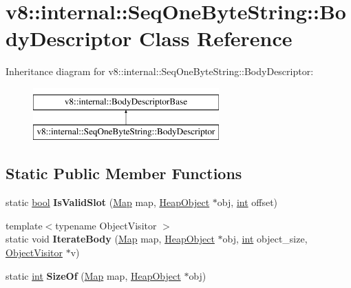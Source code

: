 \hypertarget{classv8_1_1internal_1_1SeqOneByteString_1_1BodyDescriptor}{}\section{v8\+:\+:internal\+:\+:Seq\+One\+Byte\+String\+:\+:Body\+Descriptor Class Reference}
\label{classv8_1_1internal_1_1SeqOneByteString_1_1BodyDescriptor}
Inheritance diagram for v8\+:\+:internal\+:\+:Seq\+One\+Byte\+String\+:\+:Body\+Descriptor\+:\begin{figure}[H]
\begin{center}
\leavevmode
\includegraphics[height=2.000000cm]{classv8_1_1internal_1_1SeqOneByteString_1_1BodyDescriptor}
\end{center}
\end{figure}
\subsection*{Static Public Member Functions}
\begin{DoxyCompactItemize}
\item 
\mbox{\label{classv8_1_1internal_1_1SeqOneByteString_1_1BodyDescriptor_ae0e93493ae5b3b86b698c8b9ca11453b}} 
static \mbox{\hyperlink{classbool}{bool}} {\bfseries Is\+Valid\+Slot} (\mbox{\hyperlink{classv8_1_1internal_1_1Map}{Map}} map, \mbox{\hyperlink{classv8_1_1internal_1_1HeapObject}{Heap\+Object}} $\ast$obj, \mbox{\hyperlink{classint}{int}} offset)
\item 
\mbox{\label{classv8_1_1internal_1_1SeqOneByteString_1_1BodyDescriptor_a7fba2a9f00b09b9f0dbbd28e2994e523}} 
{\footnotesize template$<$typename Object\+Visitor $>$ }\\static void {\bfseries Iterate\+Body} (\mbox{\hyperlink{classv8_1_1internal_1_1Map}{Map}} map, \mbox{\hyperlink{classv8_1_1internal_1_1HeapObject}{Heap\+Object}} $\ast$obj, \mbox{\hyperlink{classint}{int}} object\+\_\+size, \mbox{\hyperlink{classv8_1_1internal_1_1ObjectVisitor}{Object\+Visitor}} $\ast$v)
\item 
\mbox{\label{classv8_1_1internal_1_1SeqOneByteString_1_1BodyDescriptor_a6e7a6c0b9629a1750184f3ecfa2204a1}} 
static \mbox{\hyperlink{classint}{int}} {\bfseries Size\+Of} (\mbox{\hyperlink{classv8_1_1internal_1_1Map}{Map}} map, \mbox{\hyperlink{classv8_1_1internal_1_1HeapObject}{Heap\+Object}} $\ast$obj)
\end{DoxyCompactItemize}
